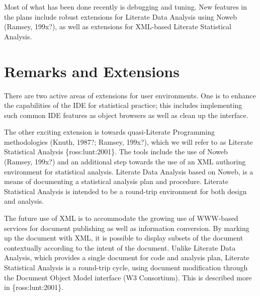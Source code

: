 \documentclass{article}
\newcommand{\citep}[1]{{\{\sf#1\}}}
\begin{document}
Most of what has been done recently is debugging and tuning.  New
features in the plans include robust extensions for Literate Data
Analysis using Noweb (Ramsey, 199x?), as well as extensions for
XML-based Literate Statistical Analysis.

\section{Remarks and Extensions}
\label{sec:remarks}

There are two active areas of extensions for user environments.  One
is to enhance the capabilities of the IDE for statistical practice;
this includes implementing such common IDE features as object browsers
as well as clean up the interface.

The other exciting extension is towards quasi-Literate Programming
methodologies (Knuth, 1987?; Ramsey, 199x?), which we will refer to as
Literate Statistical Analysis \citep{ross:lunt:2001}. The tools include
the use of Noweb (Ramsey, 199x?) and an additional step towards the
use of an XML authoring environment for statistical analysis.
Literate Data Analysis based on Noweb, is a means of documenting a
statistical analysis plan and procedure.  Literate Statistical
Analysis is intended to be a round-trip environment for both design
and analysis.

The future use of XML is to accommodate the growing use of WWW-based
services for document publishing as well as information conversion.
By marking up the document with XML, it is possible to display subsets
of the document contextually according to the intent of the document.
Unlike Literate Data Analysis, which provides a single document for
code and analysis plan, Literate Statistical Analysis is a round-trip
cycle, using document modification through the Document Object Model
interface (W3 Consortium).  This is described more in
\citep{ross:lunt:2001}. 



\end{document}
